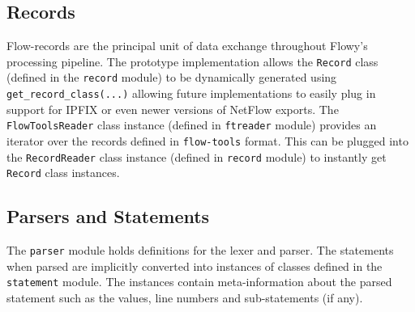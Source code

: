 \subsection{Records}\label{subsec:records}
Flow-records are the principal unit of data exchange throughout Flowy's processing pipeline. The prototype implementation allows the \texttt{Record} class (defined in the \texttt{record} module) to be dynamically generated using \texttt{get\_record\_class(...)} allowing future implementations to easily plug in support for \ac{IPFIX} or even newer versions of NetFlow \cite{rfc3954} exports. The \texttt{FlowToolsReader} class instance (defined in \texttt{ftreader} module) provides an iterator over the records defined in \texttt{flow-tools} format. This can be plugged into the \texttt{RecordReader} class instance (defined in \texttt{record} module) to instantly get \texttt{Record} class instances.

\subsection{Parsers and Statements}\label{subsec:parsers-statements}
The \texttt{parser} module holds definitions for the lexer and parser. The statements when parsed are implicitly converted into instances of classes defined in the \texttt{statement} module. The instances contain meta-information about the parsed statement such as the values, line numbers and sub-statements (if any).

